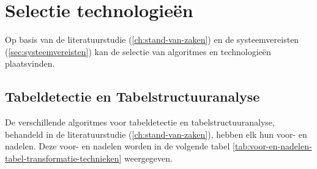 \section{Selectie technologieën}
\label{sec:selectie-technologieën}

Op basis van de literatuurstudie (\autoref{ch:stand-van-zaken}) en de systeemvereisten (\autoref{sec:systeemvereisten}) kan de selectie van algoritmes en technologieën plaatsvinden.

\subsection{Tabeldetectie en Tabelstructuuranalyse}

De verschillende algoritmes voor tabeldetectie en tabelstructuuranalyse, behandeld in de literatuurstudie (\autoref{ch:stand-van-zaken}), hebben elk hun voor- en nadelen. Deze voor- en nadelen worden in de volgende tabel \ref{tab:voor-en-nadelen-tabel-transformatie-technieken} weergegeven.

